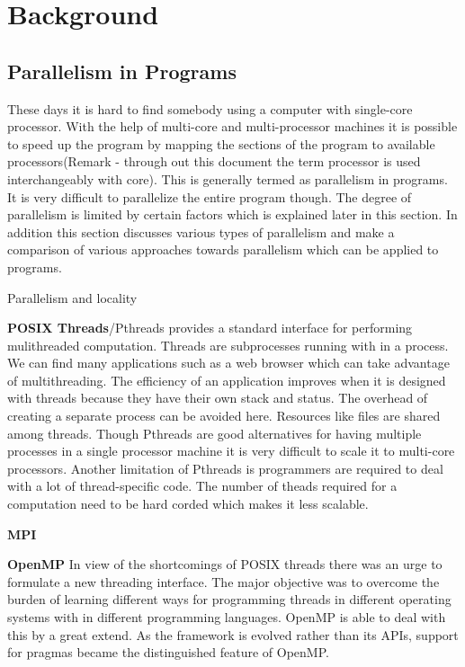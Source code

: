\documentclass[a4paper,12pt]{book}
\begin{document}
\chapter{Background}

\section{Parallelism in Programs}
These days it is hard to find somebody using a computer with single-core processor.
With the help of multi-core and multi-processor machines it is possible to speed up 
the program by mapping the sections of the program to available processors(Remark - 
through out this document the term processor is used interchangeably with core). This 
is generally termed as parallelism in programs. It is very difficult to parallelize
the entire program though. The degree of parallelism is limited by certain factors which is
explained later in this section. In addition this section discusses various types of parallelism and
make a comparison of various approaches towards parallelism which can be applied to programs.

Parallelism and locality

\textbf{POSIX Threads}/Pthreads provides a standard interface for performing mulithreaded computation. 
Threads are subprocesses running with in a process. 
We can find many applications such as a web browser which can take advantage of multithreading.
The efficiency of an application improves when it is designed with threads because they have their
own stack and status. The overhead of creating a separate process can be avoided here.
Resources like files are shared among threads. Though Pthreads are good alternatives for
having multiple processes in a single processor machine it is very difficult to scale
it to multi-core processors. Another limitation of Pthreads is programmers are required to
deal with a lot of thread-specific code. The number of theads required for a computation
need to be hard corded which makes it less scalable.

\textbf{MPI}

\textbf{OpenMP}
In view of the shortcomings of POSIX threads there was an urge to formulate a new threading
interface. The major objective was to overcome the burden of learning different ways for programming threads in different
operating systems with in different programming languages. OpenMP is able to deal with this
by a great extend. As the framework is evolved rather than its APIs, support for pragmas became the distinguished
feature of OpenMP.
\end{document}
